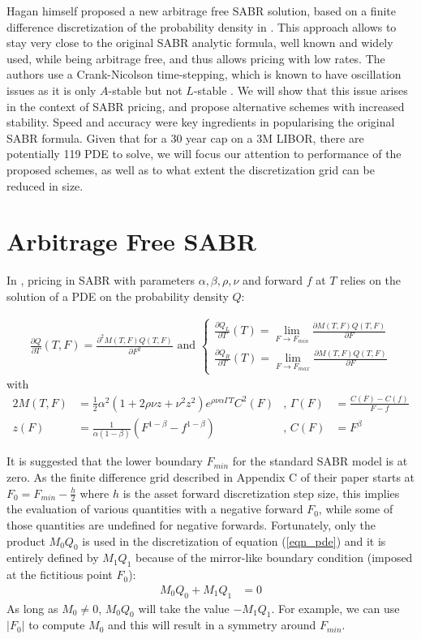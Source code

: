 \documentclass[]{rAMF2e}
\begin{document}
Hagan himself proposed a new arbitrage free SABR solution, based on a finite difference discretization of the probability density in \citep{hagan2013arbitrage}. This approach allows to stay very close to the original SABR analytic formula, well known and widely used, while being arbitrage free, and thus allows pricing with low rates. The authors use a Crank-Nicolson time-stepping, which is known to have oscillation issues \citep{duffy2004critique,GiCa2006} as it is only $A$-stable but not $L$-stable \citep{Le07}. We will show that this issue arises in the context of SABR pricing, and propose alternative schemes with increased stability. Speed and accuracy were key ingredients in popularising the original SABR formula. Given that for a 30 year cap on a 3M LIBOR, there are potentially 119 PDE to solve, we will focus our attention to performance of the proposed schemes, as well as to what extent the discretization grid can be reduced in size.

\section{Arbitrage Free SABR}
In \citep{hagan2013arbitrage}, pricing in SABR with parameters $\alpha, \beta, \rho, \nu$ and forward $f$ at $T$ relies on the solution of a PDE on the probability density $Q$:

\begin{align}\label{eqn_pde}
\frac{\partial Q}{\partial T}(T,F) = \frac{\partial^2 M(T,F) Q(T,F)}{\partial F^2} \text{ and } \begin{cases}
\frac{\partial Q_L}{\partial T}(T) = \lim_{F \to F_{min}} \frac{\partial M(T,F) Q(T,F)}{\partial F}\\
\frac{\partial Q_R}{\partial T}(T) = \lim_{F \to F_{max}} \frac{\partial M(T,F) Q(T,F)}{\partial F}
\end{cases}
\end{align}
with
\begin{alignat}{2}
M(T,F) &= \frac{1}{2} \alpha^2 (1+2\rho\nu z+ \nu^2 z^2) e^{\rho\nu\alpha\Gamma T} C^2(F) &\text{, }
\Gamma(F) &= \frac{C(F)-C(f)}{F-f}\\
z(F) &= \frac{1}{\alpha (1-\beta)}(F^{1-\beta}-f^{1-\beta}) &\text{, }
C(F) &= F^{\beta} 
\end{alignat}

It is suggested that the lower boundary $F_{min}$ for the standard SABR model is at zero. As the finite difference grid described in Appendix C of their paper starts at  $F_0 = F_{min} - \frac{h}{2}$ where $h$ is the asset forward discretization step size, this implies the evaluation of various quantities with a negative forward $F_0$, while some of those quantities are undefined for negative forwards. Fortunately, only the product $M_0 Q_0$ is used in the discretization of equation (\ref{eqn_pde}) and it is entirely defined by $M_1 Q_1$  because of the mirror-like boundary condition (imposed at the fictitious point $F_0$): 
\begin{align}\label{boundary_condition}
M_0 Q_0 + M_1 Q_1 &= 0
\end{align}
As long as $M_0 \neq 0$, $M_0 Q_0$ will take the value $-M_1 Q_1$. For example, we can use $|F_0|$ to compute $M_0$ and this will result in a symmetry around $F_{min}$.
\end{document}
